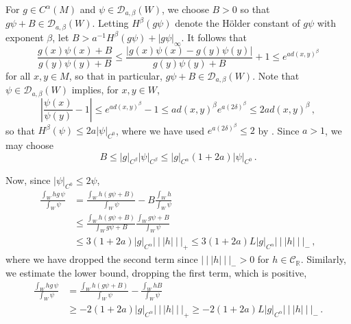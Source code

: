 \documentclass{amsart}
\numberwithin{equation}{section}
\newcommand\cC{{\mathcal C}}
\newcommand\cD{{\mathcal D}}
\newcommand\bR{{\mathbb R}}
\newcommand{\tri}{{|\:\!\!|\:\!\!|}}
\begin{document}
For $g \in C^\alpha(M)$ and $\psi \in \cD_{a, \beta}(W)$, we choose
$B > 0$ so that $g \psi + B \in \cD_{a, \beta}(W)$.
Letting $H^\beta(g \psi)$ denote the H\"older constant of $g\psi$ with exponent $\beta$, 
let $B > a^{-1} H^\beta(g \psi ) + |g \psi|_\infty$.  It follows that 
\[
\frac{g(x)\psi(x) +B}{g(y)\psi(y)+B} \le \frac{|g(x)\psi(x) - g(y)\psi(y)|}{g(y)\psi(y)+B} + 1
\le e^{a d(x,y)^\beta}
\]
for all $x,y \in M$, so that in particular, $g\psi+B \in \cD_{a,\beta}(W)$. 
Note that $\psi \in \cD_{a, \beta}(W)$ implies, for $x,y \in W$,
\begin{equation}
\label{eq:psi distortion}
\left| \frac{\psi(x)}{\psi(y)} - 1 \right| \le e^{a d(x,y)^\beta} -1 \le a d(x,y)^\beta  e^{a(2\delta)^\beta }
\le 2 a d(x,y)^\beta \, ,
\end{equation}
so that $H^\beta(\psi) \le 2a |\psi|_{C^0}$, where we have used $e^{a (2\delta)^\beta} \le 2$
by \cite[eq.~(4.9)]{DL22}.
Since $a>1$, we may choose 
\begin{equation}
\label{eq:B choice}
B \le |g|_{C^\beta} |\psi|_{C^\beta} \le |g|_{C^\alpha} (1+2a) |\psi|_{C^0} \, .
\end{equation}

Now, since $|\psi|_{C^0} \le 2 \psi$,
\begin{equation}
\label{eq:upper}
\begin{split}
\frac{\int_W h g \, \psi }{\int_W \psi }
& = \frac{\int_W h (g \psi + B) }{\int_W \psi } - B \frac{\int_W h   }{\int_W \psi } \\
& \le \frac{\int_W h (g \psi + B) }{\int_W g \psi + B } \frac{\int_W g \psi + B }{\int_W \psi } 
 \\
& \le 3(1+2a) | g|_{C^\alpha} \tri h \tri_+ \le 3(1+2a) L |g|_{C^\alpha} \tri h \tri_- \, , 
\end{split}
\end{equation}
where we have dropped the second term since $\tri h \tri_- > 0$ for $h \in \cC_\bR$.
Similarly, we estimate the lower bound, dropping the first term, which is positive,
\begin{equation}
\label{eq:lower}
\begin{split}
\frac{\int_W h g \, \psi }{\int_W \psi }
& = \frac{\int_W h (g \psi + B) }{\int_W \psi } -  \frac{\int_W h B }{\int_W \psi } \\
& \ge - 2(1+2a) |g|_{C^\alpha} \tri h \tri_+ \ge - 2(1+2a) L |g|_{C^\alpha} \tri h \tri_- \, .
\end{split}
\end{equation}
\end{document}
